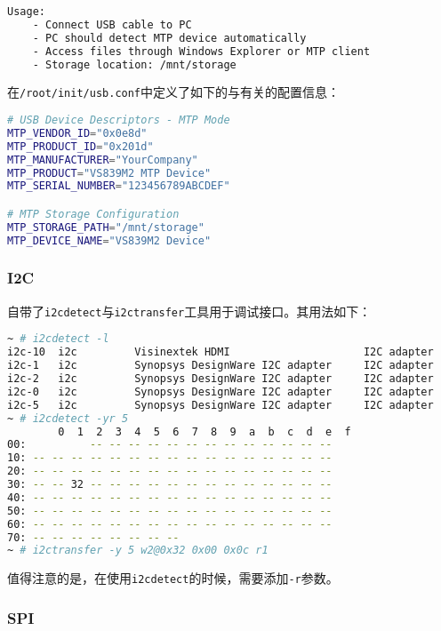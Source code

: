 \documentclass[UTF8]{ctexart}
\newcommand{\code}[1]{\colorbox{gray!10}{\lstinline[style=inlinecode]|#1|}}
\begin{document}
\begin{lstlisting}[language=sh]
Usage:
    - Connect USB cable to PC
    - PC should detect MTP device automatically
    - Access files through Windows Explorer or MTP client
    - Storage location: /mnt/storage    
\end{lstlisting}

\noindent 在\code{/root/init/usb.conf}中定义了如下的与有关的配置信息：

\begin{lstlisting}[language=sh]
# USB Device Descriptors - MTP Mode
MTP_VENDOR_ID="0x0e8d"
MTP_PRODUCT_ID="0x201d"
MTP_MANUFACTURER="YourCompany"
MTP_PRODUCT="VS839M2 MTP Device"
MTP_SERIAL_NUMBER="123456789ABCDEF"

# MTP Storage Configuration
MTP_STORAGE_PATH="/mnt/storage"
MTP_DEVICE_NAME="VS839M2 Device"
\end{lstlisting}

\subsubsection{I2C}

自带了\code{i2cdetect}与\code{i2ctransfer}工具用于调试接口。其用法如下：

\begin{lstlisting}[language=sh]
~ # i2cdetect -l
i2c-10	i2c       	Visinextek HDMI                 	I2C adapter
i2c-1	i2c       	Synopsys DesignWare I2C adapter 	I2C adapter
i2c-2	i2c       	Synopsys DesignWare I2C adapter 	I2C adapter
i2c-0	i2c       	Synopsys DesignWare I2C adapter 	I2C adapter
i2c-5	i2c       	Synopsys DesignWare I2C adapter 	I2C adapter
~ # i2cdetect -yr 5
        0  1  2  3  4  5  6  7  8  9  a  b  c  d  e  f
00:          -- -- -- -- -- -- -- -- -- -- -- -- -- 
10: -- -- -- -- -- -- -- -- -- -- -- -- -- -- -- -- 
20: -- -- -- -- -- -- -- -- -- -- -- -- -- -- -- -- 
30: -- -- 32 -- -- -- -- -- -- -- -- -- -- -- -- -- 
40: -- -- -- -- -- -- -- -- -- -- -- -- -- -- -- -- 
50: -- -- -- -- -- -- -- -- -- -- -- -- -- -- -- -- 
60: -- -- -- -- -- -- -- -- -- -- -- -- -- -- -- -- 
70: -- -- -- -- -- -- -- --                         
~ # i2ctransfer -y 5 w2@0x32 0x00 0x0c r1
\end{lstlisting}

\noindent 值得注意的是，在使用\code{i2cdetect}的时候，需要添加\code{-r}参数。

\subsubsection{SPI}
\end{document}
